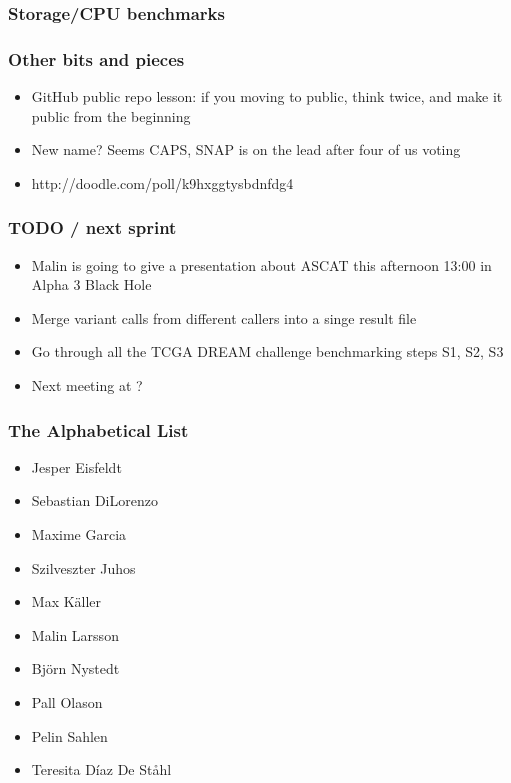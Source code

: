 \documentclass{beamer}
\begin{document}
\begin{frame}
\frametitle{Storage/CPU benchmarks}
\end{frame}

\begin{frame}
\frametitle{Other bits and pieces}
\begin{itemize}
	\item GitHub public repo lesson: if you moving to public, think twice, and make it public from the beginning
	\item New name? Seems CAPS, SNAP is on the lead after four of us voting
	\item http://doodle.com/poll/k9hxggtysbdnfdg4 
\end{itemize}
\end{frame}

\begin{frame}
\frametitle{TODO / next sprint}
	\begin{itemize}
		\item Malin is going to give a presentation about ASCAT this afternoon 13:00 in Alpha 3 Black Hole
		\item Merge variant calls from different callers into a singe result file
		\item Go through all the TCGA DREAM challenge benchmarking steps S1, S2, S3
		\item Next meeting at ?
	\end{itemize}
\end{frame}

\begin{frame}
\frametitle{The Alphabetical List}
\begin{itemize}
	\item Jesper Eisfeldt
	\item Sebastian DiLorenzo
	\item Maxime Garcia 
	\item Szilveszter Juhos 
	\item Max Käller
	\item Malin Larsson
	\item Björn Nystedt 
	\item Pall Olason
	\item Pelin Sahlen
	\item Teresita Díaz De Ståhl
\end{itemize}
\end{frame}
\end{document}
